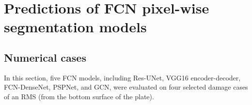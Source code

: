 \section{Predictions of FCN pixel-wise segmentation models}
\label{sec52}


\subsection{Numerical cases}
\label{sec521}
In this section, five FCN models, including Res-UNet, VGG16 encoder-decoder, FCN-DenseNet, PSPNet, and GCN, were evaluated on four selected damage cases of an RMS (from the bottom surface of the plate).

